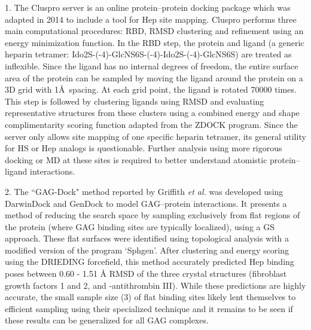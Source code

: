 \documentclass[journal=jctcce,manuscript=article]{achemso}
\begin{document}
{1. The Cluspro server is an online protein--protein docking package which was adapted in 2014 to include a tool for \ac{Hep} site mapping.\cite{Comeau2007ClusPro:Server, Mottarella2014DockingProteins,Kozakov2017TheDocking.} 
Cluspro performs three main computational procedures: \ac{RBD}, \ac{RMSD} clustering and refinement using an energy minimization function.\cite{Kozakov2017TheDocking.} In the \ac{RBD} step, the protein and ligand (a generic heparin tetramer: Ido2S-(-4)-GlcNS6S-(-4)-Ido2S-(-4)-GlcNS6S) are treated as inflexible. Since the ligand has no internal degrees of freedom, the entire surface area of the protein can be sampled by moving the ligand around the protein on a 3D grid with 1\AA~spacing. \cite{Mottarella2014DockingProteins} 
At each grid point, the ligand is rotated 70000 times. \cite{Mottarella2014DockingProteins} 
This step is followed by clustering ligands using \ac{RMSD} and evaluating representative structures from these clusters using a combined energy and shape complimentarity scoring function adapted from the ZDOCK program.\cite{Kozakov2017TheDocking., Chen2003ZDOCK:Algorithm}
Since the server only allows site mapping of one specific heparin tetramer, its general utility for \ac{HS} or \ac{Hep} analogs is questionable. 
Further analysis using more rigorous docking or \ac{MD} at these sites is required to better understand atomistic protein--ligand interactions. \cite{Mottarella2014DockingProteins} 

2. The ``GAG-Dock" method reported by Griffith \textit{et al.}\cite{Griffith2017PredictingGrowth} was developed using DarwinDock and GenDock to model \ac{GAG}--protein interactions. It presents a method of reducing the search space by sampling exclusively from flat regions of the protein (where \ac{GAG} binding sites are typically localized), using a \ac{GS} approach.\cite{Griffith2017PredictingGrowth}
These flat surfaces were identified using topological analysis with a modified version of the program `Sphgen'.\cite{Moustakas2006Development5, Hendrix1998SurfaceDocking.}
After clustering and energy scoring using the DRIEDING forcefield\cite{Mayo1990DREIDING:Simulations}, this method accurately predicted \ac{Hep} binding poses between 0.60 - 1.51 \r{A} \ac{RMSD} of the three crystal structures (fibroblast growth factors 1 and 2, and \textalpha-antithrombin III).\cite{Griffith2017PredictingGrowth} 
While these predictions are highly accurate, the small sample size (3) of flat binding sites likely lent themselves to efficient sampling using their specialized technique and it remains to be seen if these results can be generalized for all \ac{GAG} complexes.\cite{Griffith2017PredictingGrowth}

}
\end{document}
